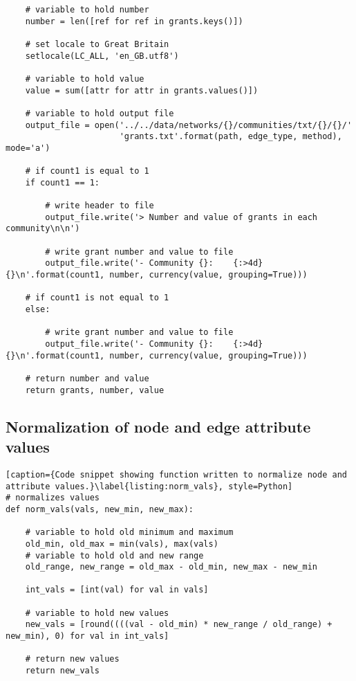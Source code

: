 \begin{lstlisting}
    # variable to hold number
    number = len([ref for ref in grants.keys()])

    # set locale to Great Britain
    setlocale(LC_ALL, 'en_GB.utf8')

    # variable to hold value
    value = sum([attr for attr in grants.values()])

    # variable to hold output file
    output_file = open('../../data/networks/{}/communities/txt/{}/{}/'
                       'grants.txt'.format(path, edge_type, method), mode='a')

    # if count1 is equal to 1
    if count1 == 1:

        # write header to file
        output_file.write('> Number and value of grants in each community\n\n')

        # write grant number and value to file
        output_file.write('- Community {}:    {:>4d} {}\n'.format(count1, number, currency(value, grouping=True)))

    # if count1 is not equal to 1
    else:

        # write grant number and value to file
        output_file.write('- Community {}:    {:>4d} {}\n'.format(count1, number, currency(value, grouping=True)))

    # return number and value
    return grants, number, value
\end{lstlisting}

\clearpage

\subsection{Normalization of node and edge attribute values}

\begin{lstlisting}[caption={Code snippet showing function written to normalize node and attribute values.}\label{listing:norm_vals}, style=Python]
# normalizes values
def norm_vals(vals, new_min, new_max):

    # variable to hold old minimum and maximum
    old_min, old_max = min(vals), max(vals)
    # variable to hold old and new range
    old_range, new_range = old_max - old_min, new_max - new_min

    int_vals = [int(val) for val in vals]

    # variable to hold new values
    new_vals = [round((((val - old_min) * new_range / old_range) + new_min), 0) for val in int_vals]

    # return new values
    return new_vals
\end{lstlisting}